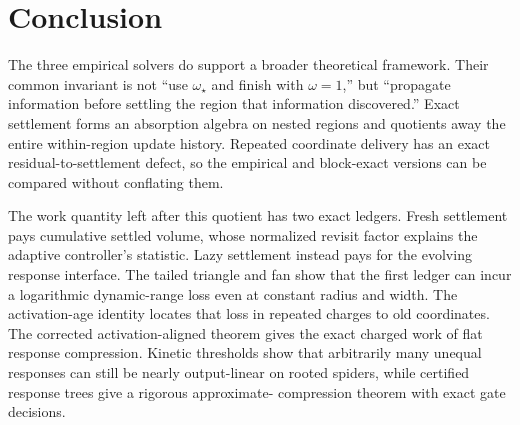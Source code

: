 \section{Conclusion}

The three empirical solvers do support a broader theoretical framework.
Their common invariant is not ``use $\omega_\star$ and finish with
$\omega=1$,'' but ``propagate information before settling the region that
information discovered.''  Exact settlement forms an absorption algebra on
nested regions and quotients away the entire within-region update history.
Repeated coordinate delivery has an exact residual-to-settlement defect, so
the empirical and block-exact versions can be compared without conflating
them.

The work quantity left after this quotient has two exact ledgers.  Fresh
settlement pays cumulative settled volume, whose normalized revisit factor
explains the adaptive controller's statistic.  Lazy settlement instead pays
for the evolving response interface.  The tailed triangle and fan show that
the first ledger can incur a logarithmic dynamic-range loss even at constant
radius and width.  The activation-age identity locates that loss in repeated
charges to old coordinates.  The corrected activation-aligned theorem gives
the exact charged work of flat response compression.  Kinetic thresholds show
that arbitrarily many unequal responses can still be nearly output-linear on
rooted spiders, while certified response trees give a rigorous approximate-
compression theorem with exact gate decisions.


